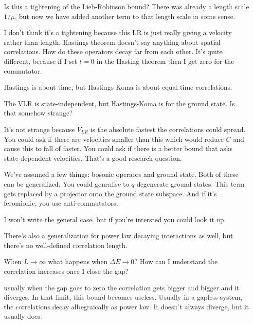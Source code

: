 \begin{question}
    Is this a tightening of the Lieb-Robinson bound?
    There was already a length scale $1/\mu$, but now we have added another term
    to that length scale in some sense.
\end{question}
I don't think it's a tightening because this LR is just really giving a velocity
rather than length.
Hastings theorem doesn't say anything about spatial correlations.
How do these operators decay far from each other.
It's quite different, because if I set $t=0$ in the Hasting theorem then I get
zero for the commutator.

Hastings is about time, but Hastings-Koma is about equal time correlations.

\begin{question}
    The VLR is state-independent,
    but Hastings-Koma is for the ground state.
    Is that somehow strange?
\end{question}
It's not strange because $V_{LR}$ is the absolute fastest the correlations could
spread.
You could ask if there are velocities smaller than this which would reduce $C$
and cause this to fall of faster.
You could ask if there is a better bound that asks state-dependent velocities.
That's a good research question.

We've assumed a few things: bosonic operaors and ground state.
Both of these can be generalized.
You could genralise to $q$-degenerate ground states.
This term gets replaced by a projector onto the ground state subspace.
And if it's feromionic, you use anti-commutators.

I won't write the general case, but if you're intersted you could look it up.

There's also a generalization for power law decaying interactions as well,
but there's no well-defined correlation length.

\begin{question}
    When $L\to\infty$ what happens when $\Delta E\to 0$?
    How can I understand the correlation increases once I close the gap?
\end{question}
usually when the gap goes to zero the correlation gets bigger and bigger and it
diverges.
In that limit, this bound becomes useless.
Usually in a gapless system, the correlations decay albegraically as power law.
It doesn't always diverge, but it usually does.

